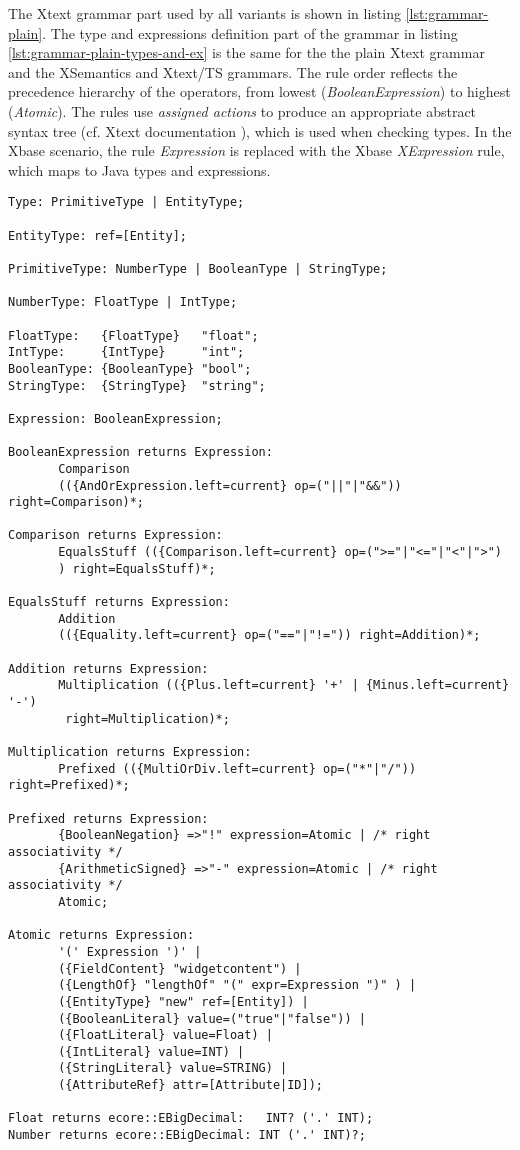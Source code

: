 The Xtext grammar part used by all variants is shown in listing \ref{lst:grammar-plain}. The type and expressions definition part of the grammar in listing \ref{lst:grammar-plain-types-and-ex} is the same for the the plain Xtext grammar and the XSemantics and Xtext/TS grammars. The rule order reflects the precedence hierarchy of the operators, from lowest (\emph{BooleanExpression}) to highest (\emph{Atomic}). The rules use \emph{assigned actions} to produce an appropriate abstract syntax tree (cf. Xtext documentation \cite{xtextdoc}), which is used when checking types.
In the Xbase scenario, the rule \emph{Expression} is replaced with the Xbase \emph{XExpression} rule, which maps to Java types and expressions.
\begin{lstlisting}[language=xtext,label=lst:grammar-plain-types-and-ex,caption=Types and Expressions.] 
Type: PrimitiveType | EntityType;

EntityType: ref=[Entity];

PrimitiveType: NumberType | BooleanType | StringType;

NumberType: FloatType | IntType;

FloatType:   {FloatType}   "float";
IntType:     {IntType}     "int";
BooleanType: {BooleanType} "bool";
StringType:	 {StringType}  "string";

Expression: BooleanExpression;

BooleanExpression returns Expression:
       Comparison
       (({AndOrExpression.left=current} op=("||"|"&&")) right=Comparison)*;

Comparison returns Expression:
       EqualsStuff (({Comparison.left=current} op=(">="|"<="|"<"|">")
       ) right=EqualsStuff)*;

EqualsStuff returns Expression:
       Addition 
       (({Equality.left=current} op=("=="|"!=")) right=Addition)*;

Addition returns Expression:
       Multiplication (({Plus.left=current} '+' | {Minus.left=current} '-') 
        right=Multiplication)*;

Multiplication returns Expression:
       Prefixed (({MultiOrDiv.left=current} op=("*"|"/")) right=Prefixed)*;

Prefixed returns Expression:
       {BooleanNegation} =>"!" expression=Atomic | /* right associativity */
       {ArithmeticSigned} =>"-" expression=Atomic | /* right associativity */
       Atomic;

Atomic returns Expression:
       '(' Expression ')' |
       ({FieldContent} "widgetcontent") |
       ({LengthOf} "lengthOf" "(" expr=Expression ")" ) |
       ({EntityType} "new" ref=[Entity]) | 
       ({BooleanLiteral} value=("true"|"false")) |
       ({FloatLiteral} value=Float) |
       ({IntLiteral} value=INT) |
       ({StringLiteral} value=STRING) |
       ({AttributeRef} attr=[Attribute|ID]);

Float returns ecore::EBigDecimal:   INT? ('.' INT);
Number returns ecore::EBigDecimal: INT ('.' INT)?;
\end{lstlisting}

